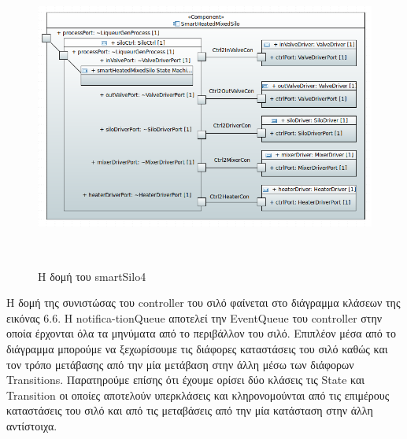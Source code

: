 \begin{figure}[htbp]
	\centering
		\includegraphics[height=10cm,width=15cm]{Figures/16.png}
	\caption{H δομή του smartSilo4}	
\end{figure}

\newpage

 Η δομή της συνιστώσας του controller του σιλό φαίνεται στο διάγραμμα κλάσεων της εικόνας 6.6. Η notifica-tionQueue αποτελεί την EventQueue του controller στην οποία έρχονται όλα τα μηνύματα από το περιβάλλον του σιλό. Επιπλέον μέσα από το διάγραμμα μπορούμε να ξεχωρίσουμε τις διάφορες καταστάσεις του σιλό καθώς και τον τρόπο μετάβασης από την μία μετάβαση στην άλλη μέσω των διάφορων Transitions. Παρατηρούμε επίσης ότι έχουμε ορίσει δύο κλάσεις τις State και Transition οι οποίες αποτελούν υπερκλάσεις και κληρονομούνται από τις επιμέρους καταστάσεις του σιλό και από τις μεταβάσεις από την μία κατάσταση στην άλλη αντίστοιχα. 
 
